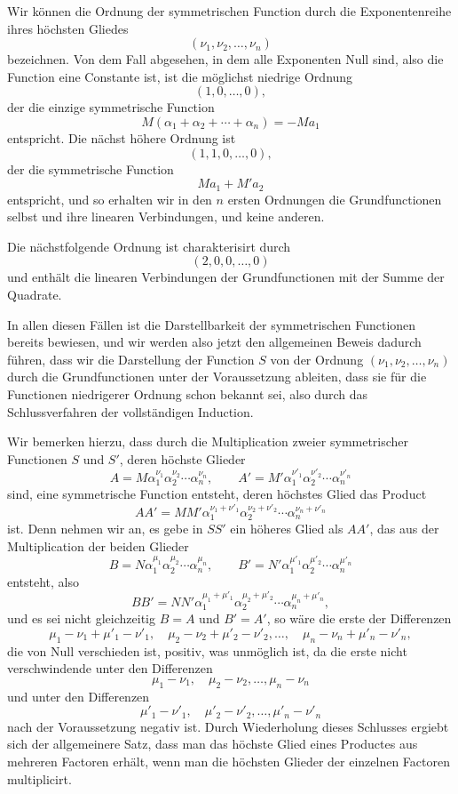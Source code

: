 \documentclass[11pt]{article}
\begin{document}
Wir können die Ordnung der symmetrischen Function durch die Exponentenreihe ihres höchsten Gliedes
\[
 (\nu_1,\nu_2,\ldots,\nu_n)
\]
bezeichnen. Von dem Fall abgesehen, in dem alle Exponenten Null sind, also die Function eine Constante ist, ist die möglichst niedrige Ordnung
\[
 (1,0,\ldots,0),
\]
der die einzige symmetrische Function
\[
 M(\alpha_1+\alpha_2+\cdots+\alpha_n)=-Ma_1
\]
entspricht. Die nächst höhere Ordnung ist
\[
 (1,1,0,\ldots,0),
\]
der die symmetrische Function
\[
 Ma_1+M'a_2
\]
entspricht, und so erhalten wir in den \(n\) ersten Ordnungen die Grundfunctionen selbst und ihre linearen Verbindungen, und keine anderen.

Die nächstfolgende Ordnung ist charakterisirt durch
\[
 (2,0,0,\ldots,0)
\]
und enthält die linearen Verbindungen der Grundfunctionen mit der Summe der Quadrate.

In allen diesen Fällen ist die Darstellbarkeit der symmetrischen Functionen bereits bewiesen, und wir werden also jetzt den allgemeinen Beweis dadurch führen, dass wir die Darstellung der Function \(S\) von der Ordnung \((\nu_1,\nu_2,\ldots,\nu_n)\) durch die Grundfunctionen unter der Voraussetzung ableiten, dass sie für die Functionen niedrigerer Ordnung schon bekannt sei, also durch das Schlussverfahren der vollständigen Induction.

Wir bemerken hierzu, dass durch die Multiplication zweier symmetrischer Functionen \(S\) und \(S'\), deren höchste Glieder
\[
 A=M\alpha_1^{\nu_1}\alpha_2^{\nu_2}\cdots\alpha_n^{\nu_n},\qquad
 A'=M'\alpha_1^{\nu'_1}\alpha_2^{\nu'_2}\cdots\alpha_n^{\nu'_n}
\]
sind, eine symmetrische Function entsteht, deren höchstes Glied das Product
\[
 AA'=MM'\alpha_1^{\nu_1+\nu'_1}\alpha_2^{\nu_2+\nu'_2}\cdots\alpha_n^{\nu_n+\nu'_n}
\]
ist. Denn nehmen wir an, es gebe in \(SS'\) ein höheres Glied als \(AA'\), das aus der Multiplication der beiden Glieder
\[
 B=N\alpha_1^{\mu_1}\alpha_2^{\mu_2}\cdots\alpha_n^{\mu_n},\qquad
 B'=N'\alpha_1^{\mu'_1}\alpha_2^{\mu'_2}\cdots\alpha_n^{\mu'_n}
\]
entsteht, also
\[
 BB'=NN'\alpha_1^{\mu_1+\mu'_1}\alpha_2^{\mu_2+\mu'_2}\cdots\alpha_n^{\mu_n+\mu'_n},
\]
und es sei nicht gleichzeitig \(B=A\) und \(B'=A'\), so wäre die erste der Differenzen
\[
 \mu_1-\nu_1+\mu'_1-\nu'_1,\quad \mu_2-\nu_2+\mu'_2-\nu'_2,\ldots,\quad
 \mu_n-\nu_n+\mu'_n-\nu'_n,
\]
die von Null verschieden ist, positiv, was unmöglich ist, da die erste nicht verschwindende unter den Differenzen
\[
 \mu_1-\nu_1,\quad \mu_2-\nu_2,\ldots,\mu_n-\nu_n
\]
und unter den Differenzen
\[
 \mu'_1-\nu'_1,\quad \mu'_2-\nu'_2,\ldots,\mu'_n-\nu'_n
\]
nach der Voraussetzung negativ ist. Durch Wiederholung dieses Schlusses ergiebt sich der allgemeinere Satz, dass man das höchste Glied eines Productes aus mehreren Factoren erhält, wenn man die höchsten Glieder der einzelnen Factoren multiplicirt.
\end{document}
